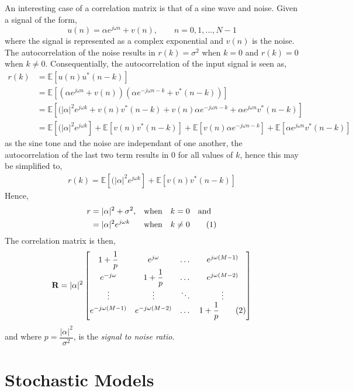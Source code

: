 \documentclass{article}
\newcommand\numberthis{\addtocounter{equation}{1}\tag{\theequation}}
\begin{document}
    An interesting case of a correlation matrix is that of a sine wave and noise. Given a signal of the form,
    \begin{equation}
        u(n) = \alpha e^{j\omega n} + v(n), \qquad n = 0,1,...,N-1
    \end{equation}
    where the signal is represented as a complex exponential and \(v(n)\) is the noise. The autocorrelation of the 
    noise results in \(r(k)=\sigma^2\) when \(k=0\) and \(r(k)=0\) when \(k\not=0\). Consequentially, the 
    autocorrelation of the input signal is seen as, 
    \begin{align*}
        r(k) &= \mathbb{E}[u(n)u^*(n-k)]\\
             &= \mathbb{E}[(\alpha e^{j\omega n} + v(n))(\alpha e^{-j\omega n-k} + v^*(n-k))]\\
             &= \mathbb{E}[(|\alpha|^2 e^{j\omega k} + v(n)v^*(n-k) + v(n)\alpha e^{-j\omega n-k} + \alpha e^{j\omega n} v^*(n-k)]\\
             &= \mathbb{E}[(|\alpha|^2 e^{j\omega k}] + \mathbb{E}[v(n)v^*(n-k)] + \mathbb{E}[v(n)\alpha e^{-j\omega n-k}] + \mathbb{E}[\alpha e^{j\omega n} v^*(n-k)]
    \end{align*}
    as the sine tone and the noise are independant of one another, the autocorrelation of the last two term results
    in \(0\) for all values of \(k\), hence this may be simplified to,
    \begin{align*}
        r(k) = \mathbb{E}[(|\alpha|^2 e^{j\omega k}] + \mathbb{E}[v(n)v^*(n-k)]
    \end{align*}
    Hence,
    \begin{align*}
        r &= |\alpha|^2 + \sigma^2, && \textrm{when} \quad k = 0 \quad \textrm{and} \\
          &= |\alpha|^2 e^{j\omega k} && \textrm{when} \quad k \not= 0            
          \numberthis  
    \end{align*}
    The correlation matrix is then,
    \[
    \textbf{R} = |\alpha|^2
    \begin{bmatrix}
        1 + \dfrac{1}p     & e^{j\omega}        & \dots     & e^{j\omega(M-1)}  \\
        e^{-j\omega}        & 1 + \dfrac{1}p    & \dots     & e^{j\omega(M-2)}  \\
        \vdots              & \vdots            & \ddots    & \vdots            \\
        e^{-j\omega(M-1)}   & e^{-j\omega(M-2)} & \dots     & 1 + \dfrac{1}p    \numberthis
    \end{bmatrix}
    \]
    and where \(p=\dfrac{|\alpha|^2}{\sigma^2}\), is the \textit{signal to noise ratio}.

    \section{Stochastic Models}
    
\end{document}
